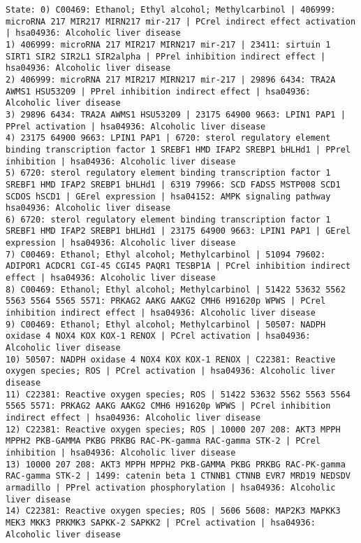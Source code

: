 \begin{lstlisting}[style=QuestionType]
State: 0) C00469: Ethanol; Ethyl alcohol; Methylcarbinol | 406999: microRNA 217 MIR217 MIRN217 mir-217 | PCrel indirect effect activation | hsa04936: Alcoholic liver disease
1) 406999: microRNA 217 MIR217 MIRN217 mir-217 | 23411: sirtuin 1 SIRT1 SIR2 SIR2L1 SIR2alpha | PPrel inhibition indirect effect | hsa04936: Alcoholic liver disease
2) 406999: microRNA 217 MIR217 MIRN217 mir-217 | 29896 6434: TRA2A AWMS1 HSU53209 | PPrel inhibition indirect effect | hsa04936: Alcoholic liver disease
3) 29896 6434: TRA2A AWMS1 HSU53209 | 23175 64900 9663: LPIN1 PAP1 | PPrel activation | hsa04936: Alcoholic liver disease
4) 23175 64900 9663: LPIN1 PAP1 | 6720: sterol regulatory element binding transcription factor 1 SREBF1 HMD IFAP2 SREBP1 bHLHd1 | PPrel inhibition | hsa04936: Alcoholic liver disease
5) 6720: sterol regulatory element binding transcription factor 1 SREBF1 HMD IFAP2 SREBP1 bHLHd1 | 6319 79966: SCD FADS5 MSTP008 SCD1 SCDOS hSCD1 | GErel expression | hsa04152: AMPK signaling pathway hsa04936: Alcoholic liver disease
6) 6720: sterol regulatory element binding transcription factor 1 SREBF1 HMD IFAP2 SREBP1 bHLHd1 | 23175 64900 9663: LPIN1 PAP1 | GErel expression | hsa04936: Alcoholic liver disease
7) C00469: Ethanol; Ethyl alcohol; Methylcarbinol | 51094 79602: ADIPOR1 ACDCR1 CGI-45 CGI45 PAQR1 TESBP1A | PCrel inhibition indirect effect | hsa04936: Alcoholic liver disease
8) C00469: Ethanol; Ethyl alcohol; Methylcarbinol | 51422 53632 5562 5563 5564 5565 5571: PRKAG2 AAKG AAKG2 CMH6 H91620p WPWS | PCrel inhibition indirect effect | hsa04936: Alcoholic liver disease
9) C00469: Ethanol; Ethyl alcohol; Methylcarbinol | 50507: NADPH oxidase 4 NOX4 KOX KOX-1 RENOX | PCrel activation | hsa04936: Alcoholic liver disease
10) 50507: NADPH oxidase 4 NOX4 KOX KOX-1 RENOX | C22381: Reactive oxygen species; ROS | PCrel activation | hsa04936: Alcoholic liver disease
11) C22381: Reactive oxygen species; ROS | 51422 53632 5562 5563 5564 5565 5571: PRKAG2 AAKG AAKG2 CMH6 H91620p WPWS | PCrel inhibition indirect effect | hsa04936: Alcoholic liver disease
12) C22381: Reactive oxygen species; ROS | 10000 207 208: AKT3 MPPH MPPH2 PKB-GAMMA PKBG PRKBG RAC-PK-gamma RAC-gamma STK-2 | PCrel inhibition | hsa04936: Alcoholic liver disease
13) 10000 207 208: AKT3 MPPH MPPH2 PKB-GAMMA PKBG PRKBG RAC-PK-gamma RAC-gamma STK-2 | 1499: catenin beta 1 CTNNB1 CTNNB EVR7 MRD19 NEDSDV armadillo | PPrel activation phosphorylation | hsa04936: Alcoholic liver disease
14) C22381: Reactive oxygen species; ROS | 5606 5608: MAP2K3 MAPKK3 MEK3 MKK3 PRKMK3 SAPKK-2 SAPKK2 | PCrel activation | hsa04936: Alcoholic liver disease

\end{lstlisting}
